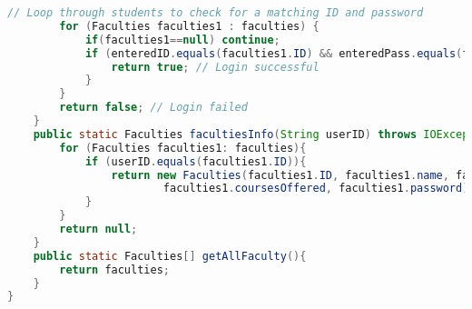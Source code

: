\begin{lstlisting}[language=Java]
        // Loop through students to check for a matching ID and password
        for (Faculties faculties1 : faculties) {
            if(faculties1==null) continue;
            if (enteredID.equals(faculties1.ID) && enteredPass.equals(faculties1.password)) {
                return true; // Login successful
            }
        }
        return false; // Login failed
    }
    public static Faculties facultiesInfo(String userID) throws IOException{
        for (Faculties faculties1: faculties){
            if (userID.equals(faculties1.ID)){
                return new Faculties(faculties1.ID, faculties1.name, faculties1.degree, faculties1.researchInterest, faculties1.email, faculties1.officeLocation,
                        faculties1.coursesOffered, faculties1.password);
            }
        }
        return null;
    }
    public static Faculties[] getAllFaculty(){
        return faculties;
    }
}







\end{lstlisting}


\lipsum[9]